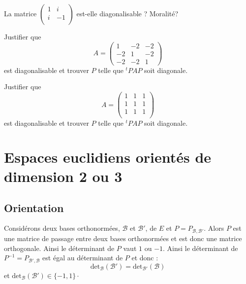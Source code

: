 \documentclass[french,11pt,twoside]{VcCours}
\begin{document}
\begin{ApplicationDirecte}{} La matrice $\begin{pmatrix}
1 &i \\
i & -1 \\
\end{pmatrix}$ est-elle diagonalisable ? Moralité?
\end{ApplicationDirecte}

\begin{Exemple}{} Justifier que
  \[
  A =
  \begin{pmatrix}
    1 &  - 2 &  - 2 \\
    - 2 & 1 &  - 2 \\
    - 2 &  - 2 & 1
  \end{pmatrix}
  \]
  est diagonalisable et trouver $P$ telle que $^tPAP$ soit diagonale.
  
\vspace{13cm}
\end{Exemple}

\begin{ApplicationDirecte}{} Justifier que
  \[
  A =
  \begin{pmatrix}
    1 &  1 &  1 \\
  1 &  1 &  1 \\
    1 &  1 &  1 \\
  \end{pmatrix}
  \]
est diagonalisable et trouver $P$ telle que $^tPAP$ soit diagonale.
\end{ApplicationDirecte}



\section{Espaces euclidiens orientés de dimension 2 ou 3}
\subsection{Orientation}
Considérons deux bases orthonormées, $\mathcal{B}$ et $\mathcal{B}'$, de $E$ et $P= P_{\mathcal{B}, \mathcal{B}'}$. Alors $P$ est une matrice de passage entre deux bases orthonormées et est donc une matrice orthogonale. Ainsi le déterminant de $P$ vaut $1$ ou $-1$. Ainsi le déterminant de $P^{-1}= P_{\mathcal{B}', \mathcal{B}}$ est égal au déterminant de $P$ et donc :
$$ \textrm{det}_{\mathcal{B}}(\mathcal{B}') =  \textrm{det}_{\mathcal{B}'}(\mathcal{B})$$
et $\textrm{det}_{\mathcal{B}}(\mathcal{B}')  \in \lbrace -1,1 \rbrace \cdot$
\end{document}

